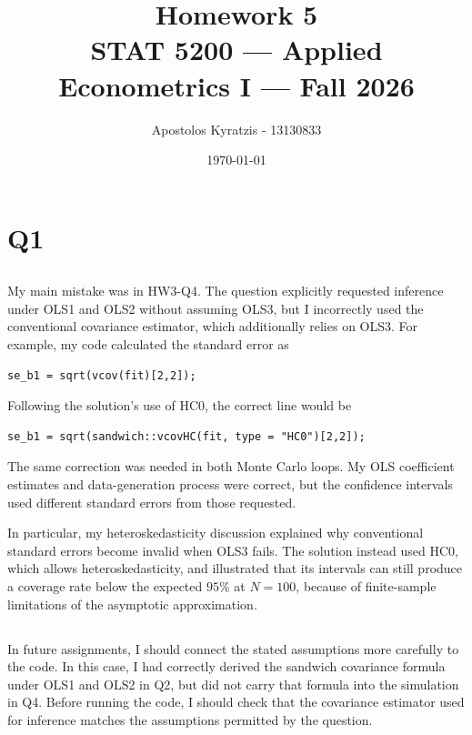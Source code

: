 \documentclass[11pt]{article}
\title{\vspace{-2em}Homework 5\\[0.3em]
       \large STAT 5200 --- Applied Econometrics I --- Fall 2026}
\author{Apostolos Kyratzis - 13130833}
\date{\today}
\begin{document}
\maketitle


\clearpage
\section{Q1}
\label{sec:q1}
\subsection{}
My main mistake was in HW3-Q4. The question explicitly requested
inference under OLS1 and OLS2 without assuming OLS3, but I incorrectly used the
conventional covariance estimator, which additionally relies on OLS3.
For example, my code calculated the standard error as
\begin{lstlisting}[style=Rcode]
se_b1 = sqrt(vcov(fit)[2,2]);
\end{lstlisting}
Following the solution's use of HC0, the correct line would be
\begin{lstlisting}[style=Rcode]
se_b1 = sqrt(sandwich::vcovHC(fit, type = "HC0")[2,2]);
\end{lstlisting}
The same correction was needed in both Monte Carlo loops. My OLS
coefficient estimates and data-generation process were correct, but
the confidence intervals used different standard errors from those
requested.

In particular, my heteroskedasticity discussion explained why
conventional standard errors become invalid when OLS3 fails. The
solution instead used HC0, which allows heteroskedasticity, and
illustrated that its intervals can still produce a coverage rate below the expected $95\%$ at $N=100$, because of finite-sample limitations of the asymptotic approximation.

\subsection{}
In future assignments, I should connect the stated assumptions more
carefully to the code. In this case, I had correctly derived the
sandwich covariance formula under OLS1 and OLS2 in Q2, but did not
carry that formula into the simulation in Q4. Before running the code,
I should check that the covariance estimator used for inference matches
the assumptions permitted by the question.
\end{document}
